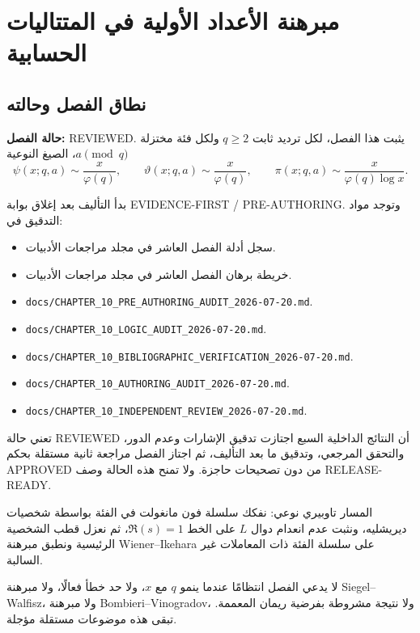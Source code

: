 \chapter{مبرهنة الأعداد الأولية في المتتاليات الحسابية}

\section{نطاق الفصل وحالته}

\noindent\textbf{حالة الفصل:} \textenglish{REVIEWED}. يثبت هذا الفصل، لكل
ترديد ثابت \(q\ge2\) ولكل فئة مختزلة \(a\pmod q\)، الصيغ النوعية
\[
\psi(x;q,a)\sim\frac{x}{\varphi(q)},
\qquad
\vartheta(x;q,a)\sim\frac{x}{\varphi(q)},
\qquad
\pi(x;q,a)\sim\frac{x}{\varphi(q)\log x}.
\]

بدأ التأليف بعد إغلاق بوابة
\textenglish{EVIDENCE-FIRST / PRE-AUTHORING}. وتوجد مواد التدقيق في:
\begin{itemize}
  \item سجل أدلة الفصل العاشر في مجلد مراجعات الأدبيات.
  \item خريطة برهان الفصل العاشر في مجلد مراجعات الأدبيات.
  \item \texttt{docs/CHAPTER\_10\_PRE\_AUTHORING\_AUDIT\_2026-07-20.md}.
  \item \texttt{docs/CHAPTER\_10\_LOGIC\_AUDIT\_2026-07-20.md}.
  \item \texttt{docs/CHAPTER\_10\_BIBLIOGRAPHIC\_VERIFICATION\_2026-07-20.md}.
  \item \texttt{docs/CHAPTER\_10\_AUTHORING\_AUDIT\_2026-07-20.md}.
  \item \texttt{docs/CHAPTER\_10\_INDEPENDENT\_REVIEW\_2026-07-20.md}.
\end{itemize}

تعني حالة \textenglish{REVIEWED} أن النتائج الداخلية السبع اجتازت تدقيق
الإشارات وعدم الدور، والتحقق المرجعي، وتدقيق ما بعد التأليف، ثم اجتاز
الفصل مراجعة ثانية مستقلة بحكم \textenglish{APPROVED} من دون تصحيحات حاجزة.
ولا تمنح هذه الحالة وصف \textenglish{RELEASE-READY}.

المسار تاوبيري نوعي: نفكك سلسلة فون مانغولت في الفئة بواسطة شخصيات
ديريشليه، ونثبت عدم انعدام دوال \(L\) على الخط \(\Re(s)=1\)، ثم نعزل
قطب الشخصية الرئيسية ونطبق مبرهنة Wiener--Ikehara على سلسلة الفئة ذات
المعاملات غير السالبة.

لا يدعي الفصل انتظامًا عندما ينمو \(q\) مع \(x\)، ولا حد خطأ فعالًا، ولا
مبرهنة Siegel--Walfisz، ولا مبرهنة Bombieri--Vinogradov، ولا نتيجة مشروطة
بفرضية ريمان المعممة. تبقى هذه موضوعات مستقلة مؤجلة.

